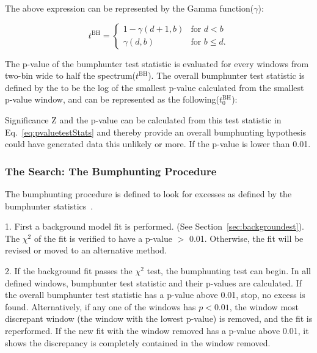     The above expression can be represented by the Gamma function($\gamma$): 

\begin{equation}
    t^{\textrm{BH}}=
    \begin{cases} 1-\gamma(d+1, b) &  \textrm{for $d < b$}
    \\
    \gamma(d,b) &  \textrm{for $b \leq d$}.
    \end{cases}
\end{equation}
    

    The p-value of the bumphunter test statistic is evaluated for every windows from two-bin wide to half the spectrum($t^{\textrm{BH}}$). The overall bumphunter test statistic is defined by the to be the log of the smallest p-value calculated from the smallest p-value window, and can be represented as the following($t^{\textrm{BH}}_{0}$):


    Significance Z and the p-value can be calculated from this test statistic in Eq.~\ref{eq:pvaluetestStats} and thereby provide an overall bumphunting hypothesis could have generated data this unlikely or more. If the p-value is lower than 0.01. %


    \subsubsection{The Search: The Bumphunting Procedure}
    The bumphunting procedure is defined to look for excesses as defined by the bumphunter statistics~\cite{Pachal:2063032}.

    1.  First a background model fit is performed. (See Section~\ref{sec:backgroundest}). The $\chi^{2}$ of the fit is verified to have a p-value $>$ 0.01. Otherwise, the fit will be revised or moved to an alternative method.

    2.  If the background fit passes the $\chi^{2}$ test, the bumphunting test can begin. In all defined windows, bumphunter test statistic and their p-values are calculated. If the overall bumphunter test statistic has a p-value above 0.01, stop, no excess is found. Alternatively, if any one of the windows has  $p< 0.01$, the window most discrepant window (the window with the lowest p-value) is removed, and the fit is reperformed. If the new fit with the window removed has a p-value above 0.01, it shows the discrepancy is completely contained in the window removed.

